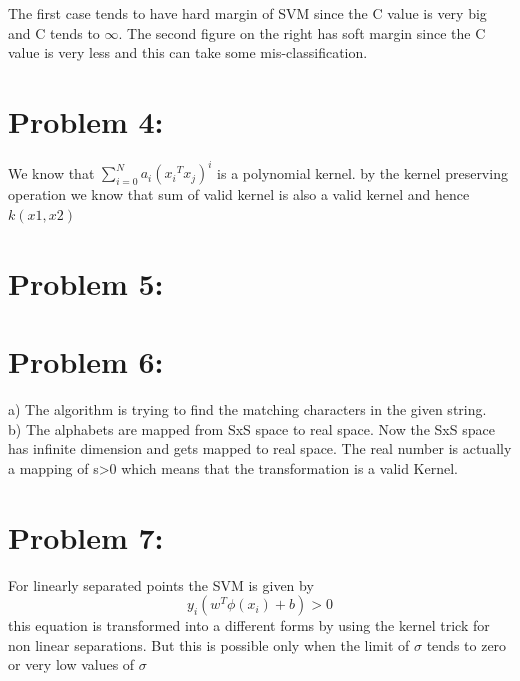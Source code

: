 \documentclass[5pt,a4paper]{article}
\begin{document}
The first case tends to have hard margin of SVM since the C value is very big and C tends to $\infty$. The second figure on the right has soft margin since the C value is very less and this can take some mis-classification.\\ 
	
	\section*{Problem 4:}
	We know that $ \sum_{i=0}^{N} a_i({x_i}^T {x_j})^i $ is a polynomial kernel. by the kernel preserving operation we know that sum of valid kernel is also a valid kernel and hence $k(x1,x2)$
	
	\section*{Problem 5:}
	\section*{Problem 6:}
	a) The algorithm is trying to find the matching characters in the given string.\\
	b) The alphabets are mapped from SxS space to real space. Now the SxS space has infinite dimension and gets mapped to real space. The real number is actually a mapping of s>0 which means that the transformation is a valid Kernel. 
	\section*{Problem 7:}
	For linearly separated points the SVM is given by 
	\begin{equation}
	y_i(w^T \phi(x_i)+b) > 0 
	\end{equation} this equation is transformed into a different forms by using the kernel trick for non linear separations. But this is possible only when the limit of $\sigma$ tends to zero or very low values of $\sigma$
	
	
\end{document}
